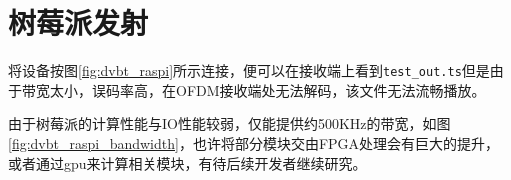 	\section{树莓派发射}
		\par 将设备按图\ref{fig:dvbt_raspi}所示连接，便可以在接收端上看到\lstinline[language=sh]{test_out.ts}但是由于带宽太小，误码率高，在OFDM接收端处无法解码，该文件无法流畅播放。
		\par 由于树莓派的计算性能与IO性能较弱，仅能提供约500KHz的带宽，如图\ref{fig:dvbt_raspi_bandwidth}，也许将部分模块交由FPGA处理会有巨大的提升，或者通过gpu来计算相关模块，有待后续开发者继续研究。
		\begin{figure}[htp]
			\centering
			 \\
		\end{figure}
